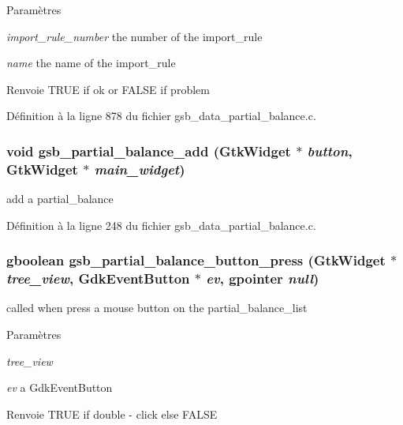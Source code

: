\begin{DoxyParams}{Paramètres}
\item[{\em import\_\-rule\_\-number}]the number of the import\_\-rule \item[{\em name}]the name of the import\_\-rule\end{DoxyParams}
\begin{DoxyReturn}{Renvoie}
TRUE if ok or FALSE if problem 
\end{DoxyReturn}


Définition à la ligne 878 du fichier gsb\_\-data\_\-partial\_\-balance.c.

\subsubsection[{gsb\_\-partial\_\-balance\_\-add}]{\setlength{\rightskip}{0pt plus 5cm}void gsb\_\-partial\_\-balance\_\-add (GtkWidget $\ast$ {\em button}, \/  GtkWidget $\ast$ {\em main\_\-widget})}\label{gsb__data__partial__balance_8h_a45a38bad71b403cb72573fc296cb6eff}
add a partial\_\-balance 

Définition à la ligne 248 du fichier gsb\_\-data\_\-partial\_\-balance.c.

\subsubsection[{gsb\_\-partial\_\-balance\_\-button\_\-press}]{\setlength{\rightskip}{0pt plus 5cm}gboolean gsb\_\-partial\_\-balance\_\-button\_\-press (GtkWidget $\ast$ {\em tree\_\-view}, \/  GdkEventButton $\ast$ {\em ev}, \/  gpointer {\em null})}\label{gsb__data__partial__balance_8h_a07410f9e80aa69142600b84367d48054}
called when press a mouse button on the partial\_\-balance\_\-list


\begin{DoxyParams}{Paramètres}
\item[{\em tree\_\-view}]\item[{\em ev}]a GdkEventButton\end{DoxyParams}
\begin{DoxyReturn}{Renvoie}
TRUE if double -\/ click else FALSE 
\end{DoxyReturn}


